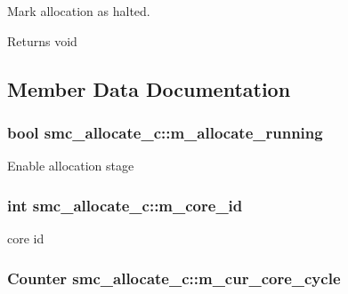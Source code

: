 Mark allocation as halted. 

\begin{DoxyReturn}{Returns}
void 
\end{DoxyReturn}


\subsection{Member Data Documentation}
\hypertarget{classsmc__allocate__c_a8369b4404232451b5fec0eff0d6ef011}{
\subsubsection[{m\_\-allocate\_\-running}]{\setlength{\rightskip}{0pt plus 5cm}bool {\bf smc\_\-allocate\_\-c::m\_\-allocate\_\-running}}}
\label{classsmc__allocate__c_a8369b4404232451b5fec0eff0d6ef011}
Enable allocation stage \hypertarget{classsmc__allocate__c_abaeb422a48ef93fb71cabc5390dee7b9}{
\subsubsection[{m\_\-core\_\-id}]{\setlength{\rightskip}{0pt plus 5cm}int {\bf smc\_\-allocate\_\-c::m\_\-core\_\-id}}}
\label{classsmc__allocate__c_abaeb422a48ef93fb71cabc5390dee7b9}
core id \hypertarget{classsmc__allocate__c_ae5879c983f2dd0520f6fb4e76d90271f}{
\subsubsection[{m\_\-cur\_\-core\_\-cycle}]{\setlength{\rightskip}{0pt plus 5cm}Counter {\bf smc\_\-allocate\_\-c::m\_\-cur\_\-core\_\-cycle}}}
\label{classsmc__allocate__c_ae5879c983f2dd0520f6fb4e76d90271f}
